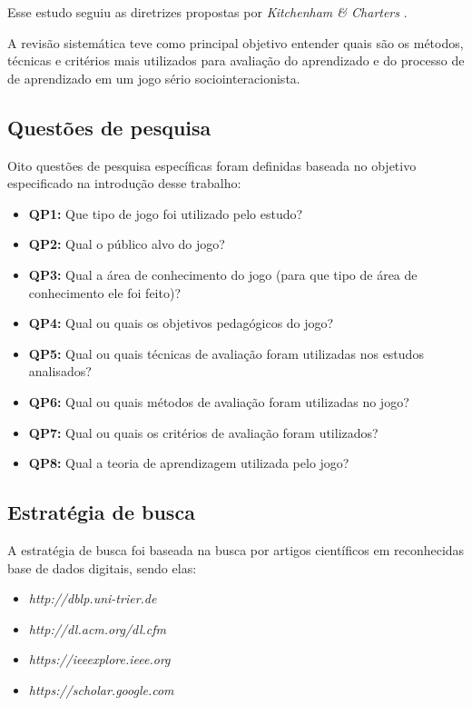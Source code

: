 \documentclass[12pt]{article}
\begin{document}
Esse estudo seguiu as diretrizes propostas por \textit{Kitchenham \& Charters} \cite{keele2007guidelines}.

A revisão sistemática teve  como principal objetivo entender quais são os métodos, técnicas e critérios mais utilizados para avaliação do aprendizado e do processo de de aprendizado em um jogo sério sociointeracionista.

\subsection{Questões de pesquisa}

Oito questões de pesquisa específicas foram definidas baseada no objetivo especificado na introdução desse trabalho:

\begin{itemize}
    \item \textbf{QP1:} Que tipo de jogo foi utilizado pelo estudo?
    \item \textbf{QP2:} Qual o público alvo do jogo?
    \item \textbf{QP3:} Qual a área de conhecimento do jogo (para que tipo de área de conhecimento ele foi feito)?
    \item \textbf{QP4:} Qual ou quais os objetivos pedagógicos do jogo?
    \item \textbf{QP5:} Qual ou quais técnicas de avaliação foram utilizadas nos estudos analisados?
    \item \textbf{QP6:} Qual ou quais métodos de avaliação foram utilizadas no jogo?
    \item \textbf{QP7:} Qual ou quais os critérios de avaliação foram utilizados?
    \item \textbf{QP8:} Qual a teoria de aprendizagem utilizada pelo jogo?
\end{itemize}

\subsection{Estratégia de busca}

A estratégia de busca foi baseada na busca por artigos científicos em reconhecidas base de dados digitais, sendo elas:

\begin{itemize}
    \item \textit{http://dblp.uni-trier.de}
    \item \textit{http://dl.acm.org/dl.cfm}
    \item \textit{https://ieeexplore.ieee.org}
    \item \textit{https://scholar.google.com}
\end{itemize}
\end{document}
